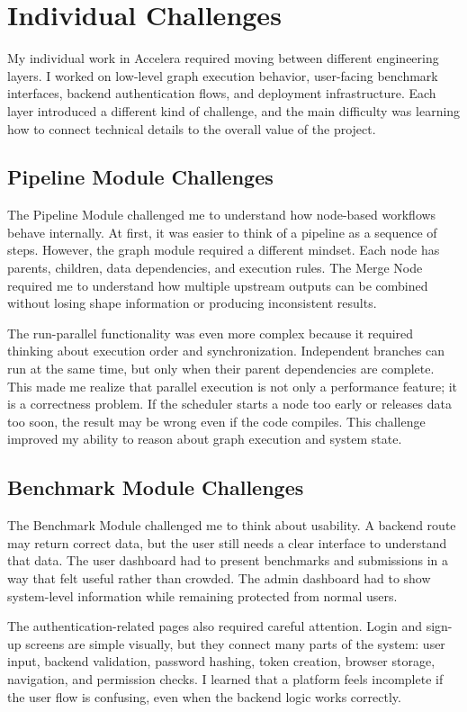 \documentclass[12pt,a4paper,oneside]{report}
\newcommand{\systemname}{Accelera}
\begin{document}
\section{Individual Challenges}
\noindent My individual work in \systemname{} required moving between different engineering layers. I worked on low-level graph execution behavior, user-facing benchmark interfaces, backend authentication flows, and deployment infrastructure. Each layer introduced a different kind of challenge, and the main difficulty was learning how to connect technical details to the overall value of the project.

\subsection{Pipeline Module Challenges}
\noindent The Pipeline Module challenged me to understand how node-based workflows behave internally. At first, it was easier to think of a pipeline as a sequence of steps. However, the graph module required a different mindset. Each node has parents, children, data dependencies, and execution rules. The Merge Node required me to understand how multiple upstream outputs can be combined without losing shape information or producing inconsistent results.

The run-parallel functionality was even more complex because it required thinking about execution order and synchronization. Independent branches can run at the same time, but only when their parent dependencies are complete. This made me realize that parallel execution is not only a performance feature; it is a correctness problem. If the scheduler starts a node too early or releases data too soon, the result may be wrong even if the code compiles. This challenge improved my ability to reason about graph execution and system state.

\subsection{Benchmark Module Challenges}
\noindent The Benchmark Module challenged me to think about usability. A backend route may return correct data, but the user still needs a clear interface to understand that data. The user dashboard had to present benchmarks and submissions in a way that felt useful rather than crowded. The admin dashboard had to show system-level information while remaining protected from normal users.

The authentication-related pages also required careful attention. Login and sign-up screens are simple visually, but they connect many parts of the system: user input, backend validation, password hashing, token creation, browser storage, navigation, and permission checks. I learned that a platform feels incomplete if the user flow is confusing, even when the backend logic works correctly.
\end{document}
